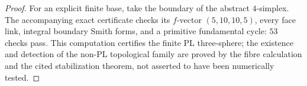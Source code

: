 \begin{proof}
For an explicit finite base, take the boundary of the abstract
$4$-simplex. The accompanying exact certificate checks its
$f$-vector $(5,10,10,5)$, every face link, integral boundary
Smith forms, and a primitive fundamental cycle: $53$ checks
pass. This computation certifies the finite PL three-sphere;
the existence and detection of the non-PL topological family
are proved by the fibre calculation and the cited stabilization
theorem, not asserted to have been numerically tested.
\end{proof}
